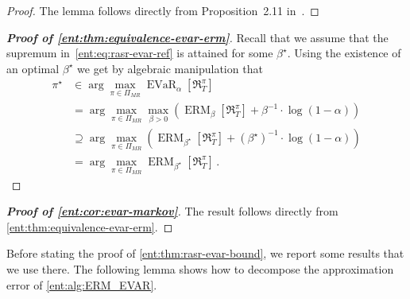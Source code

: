 \documentclass[twoside]{article}
\newcommand{\opt}{^\star}
\newcommand{\erm}[2]{\operatorname{ERM}_{#1}\left[#2\right]}
\newcommand{\evar}[2]{\operatorname{EVaR}_{#1} \left[#2\right]}
\theoremstyle{plain}
\theoremstyle{definition}
\theoremstyle{remark}
\renewcommand{\cite}[1]{\citep{#1}}
\begin{document}
\begin{proof}
The lemma follows directly from Proposition~2.11 in~\cite{Ahmadi-Javid2017}.
\end{proof}

\begin{proof}[\textbf{Proof of \cref{ent:thm:equivalence-evar-erm}}]
Recall that we assume that the supremum in~\eqref{ent:eq:rasr-evar-ref} is attained for some $\beta\opt$. Using the existence of an optimal $\beta\opt$ we get by algebraic manipulation that
%
\begin{equation}\label{ent:eq:evar-erm-arg-max}
\begin{aligned}
\pi\opt &\in \arg\max_{\pi\in \Pi_{MR}} \evar{\alpha}{\mathfrak{R}^{\pi}_{T}} \\
&= \arg\max_{\pi\in\Pi_{MR}} \max_{\beta>0} \left( \erm{\beta}{\mathfrak{R}_{T}^\pi} + \beta^{-1} \cdot \log(1-\alpha)  \right) \\
&\supseteq \arg\max_{\pi\in \Pi_{MR}} \left( \erm{\beta\opt}{\mathfrak{R}_{T}^\pi} + (\beta\opt)^{-1} \cdot \log(1-\alpha)  \right)  \\
&= \arg\max_{\pi\in \Pi_{MR}}  \erm{\beta\opt}{\mathfrak{R}_{T}^\pi} \,.
\end{aligned}
\end{equation}
%
\end{proof}

\begin{proof}[\textbf{Proof of \cref{ent:cor:evar-markov}}]
The result follows directly from \cref{ent:thm:equivalence-evar-erm}.
\end{proof}

\newcommand{\api}{\hat{\pi}\opt}
Before stating the proof of \cref{ent:thm:rasr-evar-bound}, we report some results that we use there. The following lemma shows how to decompose the approximation error of \cref{ent:alg:ERM_EVAR}.
\end{document}

